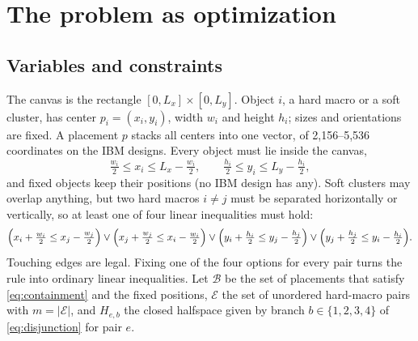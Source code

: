 \section{The problem as optimization}\label{sec:problem}

\subsection{Variables and constraints}\label{sec:geometry}\label{sec:geometry-analysis}

The canvas is the rectangle $[0,L_x]\times[0,L_y]$. Object $i$, a hard macro or a
soft cluster, has center $p_i=(x_i,y_i)$, width $w_i$ and height $h_i$; sizes and
orientations are fixed. A placement $p$ stacks all centers into one vector, of
2,156--5,536 coordinates on the IBM designs. Every object must lie inside the
canvas,
\begin{equation}
  \tfrac{w_i}{2}\le x_i\le L_x-\tfrac{w_i}{2},\qquad
  \tfrac{h_i}{2}\le y_i\le L_y-\tfrac{h_i}{2},
  \label{eq:containment}
\end{equation}
and fixed objects keep their positions (no IBM design has any). Soft clusters may
overlap anything, but two hard macros $i\neq j$ must be separated horizontally or
vertically, so at least one of four linear inequalities must hold:
\begin{equation}
\Bigl(x_i+\tfrac{w_i}{2}\le x_j-\tfrac{w_j}{2}\Bigr)\lor
\Bigl(x_j+\tfrac{w_j}{2}\le x_i-\tfrac{w_i}{2}\Bigr)\lor
\Bigl(y_i+\tfrac{h_i}{2}\le y_j-\tfrac{h_j}{2}\Bigr)\lor
\Bigl(y_j+\tfrac{h_j}{2}\le y_i-\tfrac{h_i}{2}\Bigr).
\label{eq:disjunction}
\end{equation}
Touching edges are legal. Fixing one of the four options for every pair turns the
rule into ordinary linear inequalities. Let $\mathcal B$ be the set of placements
that satisfy \eqref{eq:containment} and the fixed positions, $\mathcal E$ the set of
unordered hard-macro pairs with $m=|\mathcal E|$, and $H_{e,b}$ the closed halfspace
given by branch $b\in\{1,2,3,4\}$ of \eqref{eq:disjunction} for pair $e$.


